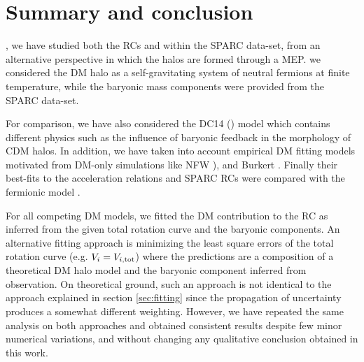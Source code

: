\section{Summary and conclusion}
\label{sec:conclusion}

, we have studied both the RCs and  within the SPARC data-set, from an alternative perspective in which the halos are formed through a MEP. 
 we considered the DM halo as a self-gravitating system of neutral fermions at finite temperature, while the baryonic mass components were provided from the SPARC data-set. 

For comparison, we have also considered the DC14 () model which contains different physics such as the influence of baryonic feedback in the morphology of CDM halos. In addition, we have taken into account empirical DM fitting models motivated  from DM-only simulations like NFW ), and Burkert . Finally their best-fits to the acceleration relations and SPARC RCs were compared with the fermionic model . %

For all competing DM models, we fitted the DM contribution to the RC as inferred from the given total rotation curve and the baryonic components. An alternative fitting approach is minimizing the least square errors of the total rotation curve (e.g. $V_i = V_{i, \rm tot}$) where the predictions are a composition of a theoretical DM halo model and the baryonic component inferred from observation. On theoretical ground, such an approach is not identical to the approach explained in section \ref{sec:fitting} since the propagation of uncertainty produces a somewhat different weighting. However, we have repeated the same analysis on both approaches and obtained consistent results despite few minor numerical variations, and without changing any qualitative conclusion obtained in this work.

